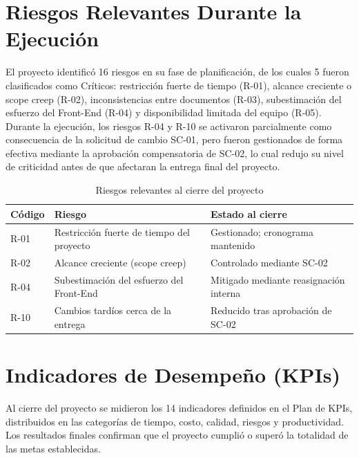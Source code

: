 \documentclass[11pt,spanish]{article}
\begin{document}
\section{Riesgos Relevantes Durante la Ejecución}

El proyecto identificó 16 riesgos en su fase de planificación, de los cuales 5 fueron clasificados como Críticos: restricción fuerte de tiempo (R-01), alcance creciente o scope creep (R-02), inconsistencias entre documentos (R-03), subestimación del esfuerzo del Front-End (R-04) y disponibilidad limitada del equipo (R-05).\\
Durante la ejecución, los riesgos R-04 y R-10 se activaron parcialmente como consecuencia de la solicitud de cambio SC-01, pero fueron gestionados de forma efectiva mediante la aprobación compensatoria de SC-02, lo cual redujo su nivel de criticidad antes de que afectaran la entrega final del proyecto.


\begin{table}[H]
\centering
\caption{Riesgos relevantes al cierre del proyecto}
\label{tab:riesgos}
\begin{tabularx}{\textwidth}{p{1.5cm}Yp{4cm}}
\toprule
\textbf{Código} &
\textbf{Riesgo} &
\textbf{Estado al cierre} \\
\midrule

R-01 &
Restricción fuerte de tiempo del proyecto &
Gestionado; cronograma mantenido
\\

R-02 &
Alcance creciente (scope creep) &
Controlado mediante SC-02
\\

R-04 &
Subestimación del esfuerzo del Front-End &
Mitigado mediante reasignación interna
\\

R-10 &
Cambios tardíos cerca de la entrega &
Reducido tras aprobación de SC-02
\\

\bottomrule
\end{tabularx}
\end{table}


\section{Indicadores de Desempeño (KPIs)}

Al cierre del proyecto se midieron los 14 indicadores definidos en el Plan de KPIs, distribuidos en las categorías de tiempo, costo, calidad, riesgos y productividad. Los resultados finales confirman que el proyecto cumplió o superó la totalidad de las metas establecidas.
\end{document}
